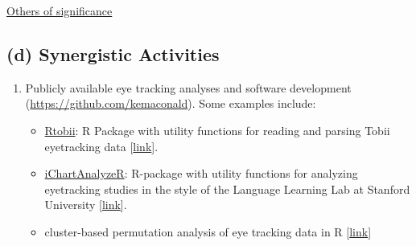 \documentclass[svgnames,11pt]{article}
\begin{document}



\noindent
\underline{Others of significance}



\subsection*{(d) Synergistic Activities}
\begin{enumerate}

\item Publicly available eye tracking analyses and software development (\href{https://github.com/kemaconald}{https://github.com/kemaconald}). Some examples include:
    \begin{itemize}
        \item \underline{Rtobii}: R Package with utility functions for reading and parsing Tobii eyetracking data [\href{https://github.com/kemacdonald/Rtobii}{link}].
        \item \underline{iChartAnalyzeR}: R-package with utility functions for analyzing eyetracking studies in the style of the Language Learning Lab at Stanford University [\href{https://github.com/kemacdonald/iChartAnalyzeR}{link}].
        \item cluster-based permutation analysis of eye tracking data in R [\href{https://kemacdonald.com/materials/cesana-arlotti_cluster_analysis.nb.html}{link}]
    \end{itemize}


\end{enumerate}
\end{document}
